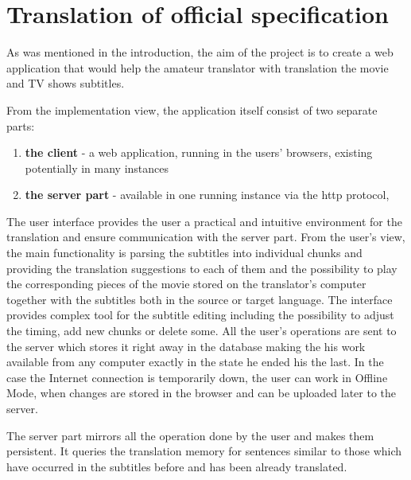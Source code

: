 \section{Translation of official specification}

As was mentioned in the introduction, the aim of the project is to create a web application that would help the amateur translator with translation the movie and TV shows subtitles.

From the implementation view, the application itself consist of two separate parts:
\begin{enumerate} 
    \item \textbf{the client} - a web application, running in the users' browsers, existing potentially in many instances
    \item \textbf{the server part} - available in one running instance via the http protocol,
\end{enumerate}

The user interface provides the user a practical and intuitive environment for the translation and ensure communication with the server part. From the user's view, the main functionality is parsing the subtitles into individual chunks and providing the translation suggestions to each of them and the possibility to play the corresponding pieces of the movie stored on the translator's computer together with the subtitles both in the source or target language. The interface provides complex tool for the subtitle editing including the possibility to adjust the timing, add new chunks or delete some. All the user's operations are sent to the server which stores it right away in the database making the his work available from any computer exactly in the state he ended his the last. In the case the Internet connection is temporarily down, the user can work in Offline Mode, when changes are stored in the browser and can be uploaded later to the server.

The server part mirrors all the operation done by the user and makes them persistent. It queries the translation memory for sentences similar to those which have occurred in the subtitles before and has been already translated. 

